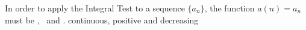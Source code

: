 {In order to apply the Integral Test to a sequence $\{a_n\}$, the function $a(n) = a_n$ must be 
\underlinespace, \underlinespace\ and \underlinespace.}
{continuous, positive and decreasing
}